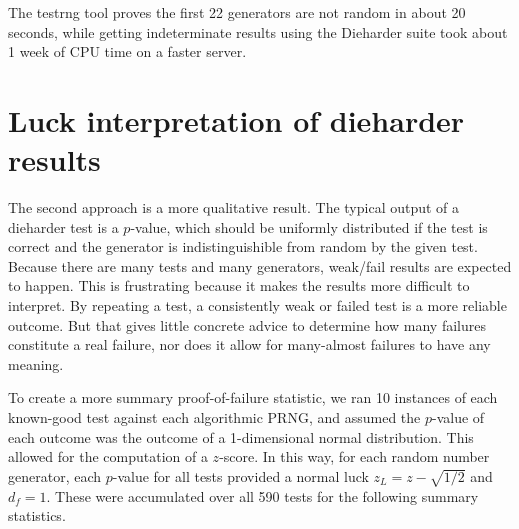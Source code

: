The testrng tool proves the first 22 generators are not random in about 20 seconds, while getting indeterminate results using the Dieharder suite took about 1 week of CPU time on a faster server.

\section{Luck interpretation of dieharder results}
The second approach is a more qualitative result.  The typical output of a dieharder test is a $p$-value, which should be uniformly distributed if the test is correct and the generator is indistinguishible from random by the given test.  Because there are many tests and many generators, weak/fail results are expected to happen.  This is frustrating because it makes the results more difficult to interpret.  By repeating a test, a consistently weak or failed test is a more reliable outcome.  But that gives little concrete advice to determine how many failures constitute a real failure, nor does it allow for many-almost failures to have any meaning.

To create a more summary proof-of-failure statistic, we ran 10 instances of each known-good test against each algorithmic PRNG, and assumed the $p$-value of each outcome was the outcome of a 1-dimensional normal distribution.  This  allowed for the computation of a $z$-score.  In this way, for each random number generator, each $p$-value for all tests provided a normal luck $z_L=z-\sqrt{1/2}$ and $d_f=1$. These were accumulated over all 590 tests for the following summary statistics.

